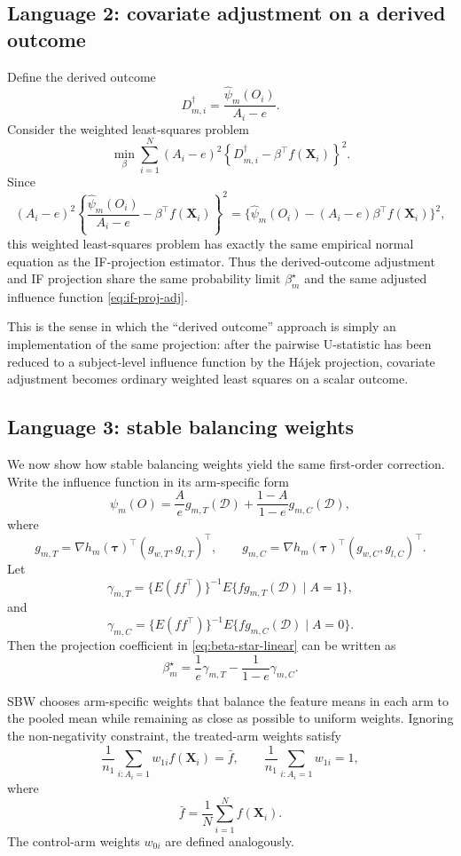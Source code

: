 \documentclass[11pt,a4paper]{article}
\begin{document}
\subsection{Language 2: covariate adjustment on a derived outcome}

Define the derived outcome
\[
D_{m,i}^\dagger
=
\frac{\hat\psi_m(O_i)}{A_i-e}.
\]
Consider the weighted least-squares problem
\[
\min_\beta
\sum_{i=1}^N
(A_i-e)^2
\left\{
D_{m,i}^\dagger-\beta^\top f(\mathbf X_i)
\right\}^2.
\]
Since
\[
(A_i-e)^2
\left\{
\frac{\hat\psi_m(O_i)}{A_i-e}
-
\beta^\top f(\mathbf X_i)
\right\}^2
=
\{\hat\psi_m(O_i)-(A_i-e)\beta^\top f(\mathbf X_i)\}^2,
\]
this weighted least-squares problem has exactly the same empirical normal equation as
the IF-projection estimator. Thus the derived-outcome adjustment and IF projection share
the same probability limit \(\beta_m^\star\) and the same adjusted influence function
\eqref{eq:if-proj-adj}.

This is the sense in which the ``derived outcome'' approach is simply an implementation
of the same projection: after the pairwise U-statistic has been reduced to a
subject-level influence function by the H\'ajek projection, covariate adjustment becomes
ordinary weighted least squares on a scalar outcome.

\subsection{Language 3: stable balancing weights}

We now show how stable balancing weights yield the same first-order correction. Write the
influence function in its arm-specific form
\[
\psi_m(O)
=
\frac{A}{e}g_{m,T}(\mathcal D)
+
\frac{1-A}{1-e}g_{m,C}(\mathcal D),
\]
where
\[
g_{m,T}
=
\nabla h_m(\boldsymbol\tau)^\top
(g_{w,T},g_{l,T})^\top,
\qquad
g_{m,C}
=
\nabla h_m(\boldsymbol\tau)^\top
(g_{w,C},g_{l,C})^\top.
\]
Let
\[
\gamma_{m,T}
=
\{E(ff^\top)\}^{-1}E\{f g_{m,T}(\mathcal D)\mid A=1\},
\]
and
\[
\gamma_{m,C}
=
\{E(ff^\top)\}^{-1}E\{f g_{m,C}(\mathcal D)\mid A=0\}.
\]
Then the projection coefficient in \eqref{eq:beta-star-linear} can be written as
\begin{equation}
\label{eq:beta-star-arm}
\beta_m^\star
=
\frac{1}{e}\gamma_{m,T}
-
\frac{1}{1-e}\gamma_{m,C}.
\end{equation}

SBW chooses arm-specific weights that balance the feature means in each arm to the pooled
mean while remaining as close as possible to uniform weights. Ignoring the non-negativity
constraint, the treated-arm weights satisfy
\[
\frac1{n_1}\sum_{i:A_i=1}w_{1i}f(\mathbf X_i)
=
\bar f,
\qquad
\frac1{n_1}\sum_{i:A_i=1}w_{1i}=1,
\]
where
\[
\bar f=\frac1N\sum_{i=1}^N f(\mathbf X_i).
\]
The control-arm weights \(w_{0i}\) are defined analogously.
\end{document}
